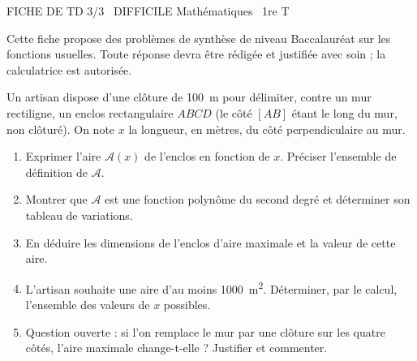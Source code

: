 \documentclass[11pt]{article}
\begin{document}
\begin{tcolorbox}[enhanced,colback=popink,colframe=popink,arc=10pt,boxrule=0pt,left=12pt,right=12pt,top=9pt,bottom=9pt]
{\color{white}\popxbold\small FICHE DE TD 3/3 \textbullet\ DIFFICILE \hfill Mathématiques \textbullet\ 1re T\par}
\end{tcolorbox}
\vspace{4pt}
Cette fiche propose des problèmes de synthèse de niveau Baccalauréat sur les fonctions usuelles. Toute réponse devra être rédigée et justifiée avec soin ; la calculatrice est autorisée.

\begin{exercice}
Un artisan dispose d'une clôture de \SI{100}{\meter} pour délimiter, contre un mur rectiligne, un enclos rectangulaire $ABCD$ (le côté $[AB]$ étant le long du mur, non clôturé). On note $x$ la longueur, en mètres, du côté perpendiculaire au mur.
\begin{enumerate}
\item Exprimer l'aire $\mathcal{A}(x)$ de l'enclos en fonction de $x$. Préciser l'ensemble de définition de $\mathcal{A}$.
\item Montrer que $\mathcal{A}$ est une fonction polynôme du second degré et déterminer son tableau de variations.
\item En déduire les dimensions de l'enclos d'aire maximale et la valeur de cette aire.
\item L'artisan souhaite une aire d'au moins \SI{1000}{\meter\squared}. Déterminer, par le calcul, l'ensemble des valeurs de $x$ possibles.
\item Question ouverte : si l'on remplace le mur par une clôture sur les quatre côtés, l'aire maximale change-t-elle ? Justifier et commenter.
\end{enumerate}
\end{exercice}
\end{document}
